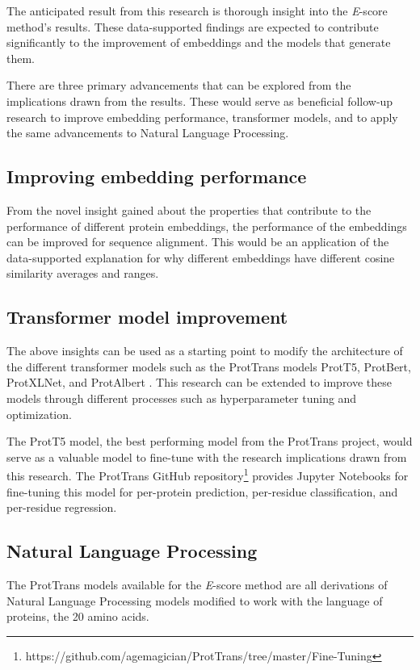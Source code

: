 \documentclass[
	letterpaper, %
	10pt, %
]{journalArticle}
\begin{document}
The anticipated result from this research is thorough insight into the \textit{E}-score method's results. These data-supported findings are expected to contribute significantly to the improvement of embeddings and the models that generate them.

There are three primary advancements that can be explored from the implications drawn from the results. These would serve as beneficial follow-up research to improve embedding performance, transformer models, and to apply the same advancements to Natural Language Processing.

\subsection{Improving embedding performance}

From the novel insight gained about the properties that contribute to the performance of different protein embeddings, the performance of the embeddings can be improved for sequence alignment. This would be an application of the data-supported explanation for why different embeddings have different cosine similarity averages and ranges.

\subsection{Transformer model improvement}

The above insights can be used as a starting point to modify the architecture of the different transformer \autocite{Vaswani:2017} models such as the ProtTrans models ProtT5, ProtBert, ProtXLNet, and ProtAlbert \autocite{Elnaggar:2021}. This research can be extended to improve these models through different processes such as hyperparameter tuning and optimization.

The ProtT5 model, the best performing model from the ProtTrans project, would serve as a valuable model to fine-tune with the research implications drawn from this research. The ProtTrans GitHub repository\footnote{https://github.com/agemagician/ProtTrans/tree/master/Fine-Tuning} provides Jupyter Notebooks for fine-tuning this model for per-protein prediction, per-residue classification, and per-residue regression.

\subsection{Natural Language Processing}
The ProtTrans models available for the \textit{E}-score method are all derivations of Natural Language Processing models modified to work with the language of proteins, the 20 amino acids.
\end{document}
